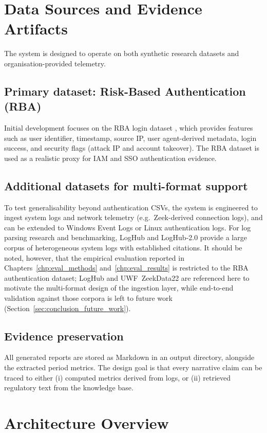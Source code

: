 \documentclass[]{UCD_CS_FYP_Report}
\begin{document}
\section{Data Sources and Evidence Artifacts}
\label{sec:data_sources}

The system is designed to operate on both synthetic research datasets and organisation-provided telemetry.

\subsection{Primary dataset: Risk-Based Authentication (RBA)}
Initial development focuses on the RBA login dataset \cite{KaggleRBA2023}, which provides features such as user identifier, timestamp, source IP, user agent-derived metadata, login success, and security flags (attack IP and account takeover). The RBA dataset is used as a realistic proxy for IAM and SSO authentication evidence.

\subsection{Additional datasets for multi-format support}
To test generalisability beyond authentication CSVs, the system is engineered to ingest system logs and network telemetry (e.g.\ Zeek-derived connection logs), and can be extended to Windows Event Logs or Linux authentication logs. For log parsing research and benchmarking, LogHub and LogHub-2.0 provide a large corpus of heterogeneous system logs with established citations. It should be noted, however, that the empirical evaluation reported in Chapters~\ref{chp:eval_methods} and~\ref{chp:eval_results} is restricted to the RBA authentication dataset; LogHub and UWF~ZeekData22 are referenced here to motivate the multi-format design of the ingestion layer, while end-to-end validation against those corpora is left to future work (Section~\ref{sec:conclusion_future_work}).

\subsection{Evidence preservation}
All generated reports are stored as Markdown in an output directory, alongside the extracted period metrics. The design goal is that every narrative claim can be traced to either (i) computed metrics derived from logs, or (ii) retrieved regulatory text from the knowledge base.

\section{Architecture Overview}
\label{sec:architecture_overview}
\end{document}

